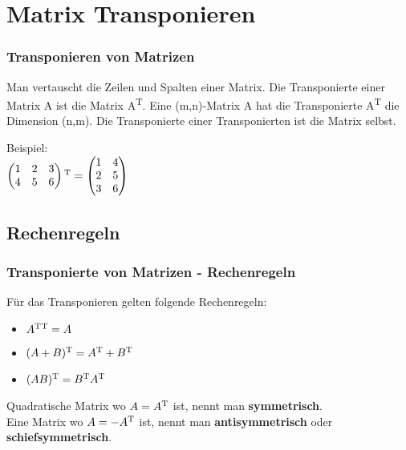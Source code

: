 \section{Matrix Transponieren}
\begin{frame}
\frametitle{Transponieren von Matrizen}
Man vertauscht die Zeilen und Spalten einer Matrix. Die Transponierte einer Matrix A ist die Matrix A\textsuperscript{T}.
Eine (m,n)-Matrix A hat die Transponierte A\textsuperscript{T} die Dimension (n,m). Die Transponierte einer Transponierten ist die Matrix selbst.
\newline

Beispiel:\\
$\begin{pmatrix}
1 & 2 & 3\\
4 & 5 & 6
\end{pmatrix}\textsuperscript{T} = \begin{pmatrix}
1 & 4\\
2 & 5\\
3 & 6
\end{pmatrix}$

\end{frame}

\subsection{Rechenregeln}
\begin{frame}
\frametitle{Transponierte von Matrizen - Rechenregeln}
Für das Transponieren gelten folgende Rechenregeln:
\begin{itemize}
\item $A\textsuperscript{T}\textsuperscript{T} = A$
\item $(A+B)\textsuperscript{T} = A\textsuperscript{T} + B\textsuperscript{T}$
\item $(AB)\textsuperscript{T} = B\textsuperscript{T}A\textsuperscript{T}$
\end{itemize}

Quadratische Matrix wo $A = A\textsuperscript{T}$ ist, nennt man \textbf{symmetrisch}.\\
Eine Matrix wo $A = -A\textsuperscript{T}$ ist, nennt man \textbf{antisymmetrisch} oder \textbf{schiefsymmetrisch}.
\end{frame}

